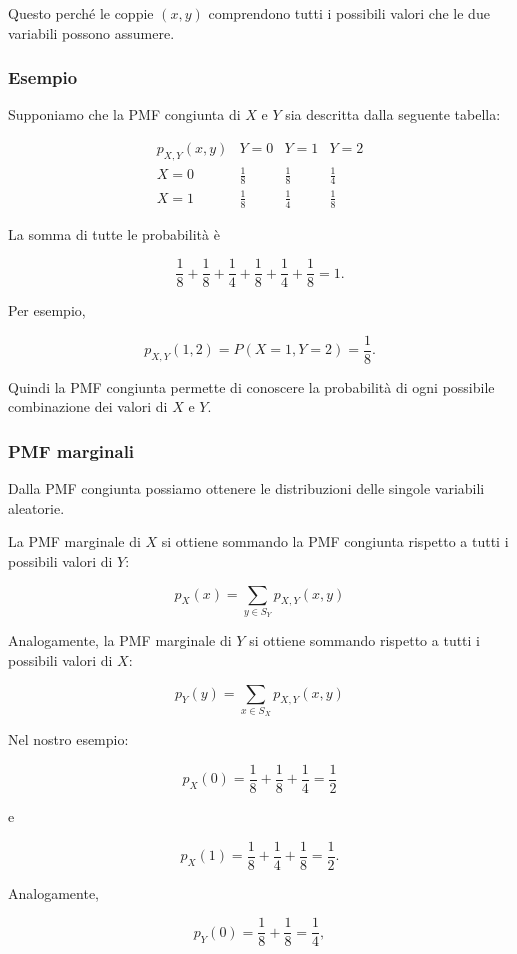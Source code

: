 Questo perché le coppie $(x,y)$ comprendono tutti i possibili valori che le due variabili possono assumere.

\subsubsection{Esempio}

Supponiamo che la PMF congiunta di $X$ e $Y$ sia descritta dalla seguente tabella:

$$
\begin{array}{c|ccc}
p_{X,Y}(x,y) & Y=0 & Y=1 & Y=2\\
\hline
X=0 & \frac{1}{8} & \frac{1}{8} & \frac{1}{4}\\
X=1 & \frac{1}{8} & \frac{1}{4} & \frac{1}{8}
\end{array}
$$

La somma di tutte le probabilità è

$$
\frac18+\frac18+\frac14+
\frac18+\frac14+\frac18=1.
$$

Per esempio,

$$
p_{X,Y}(1,2)
=
P(X=1,Y=2)
=
\frac18.
$$

Quindi la PMF congiunta permette di conoscere la probabilità di ogni possibile combinazione dei valori di $X$ e $Y$.

\subsubsection{PMF marginali}

Dalla PMF congiunta possiamo ottenere le distribuzioni delle singole variabili aleatorie.

La PMF marginale di $X$ si ottiene sommando la PMF congiunta rispetto a tutti i possibili valori di $Y$:

$$
\boxed{
p_X(x)
=
\sum_{y\in S_Y}p_{X,Y}(x,y)
}
$$

Analogamente, la PMF marginale di $Y$ si ottiene sommando rispetto a tutti i possibili valori di $X$:

$$
\boxed{
p_Y(y)
=
\sum_{x\in S_X}p_{X,Y}(x,y)
}
$$

Nel nostro esempio:

$$
p_X(0)
=
\frac18+\frac18+\frac14
=
\frac12
$$

e

$$
p_X(1)
=
\frac18+\frac14+\frac18
=
\frac12.
$$

Analogamente,

$$
p_Y(0)
=
\frac18+\frac18
=
\frac14,
$$

